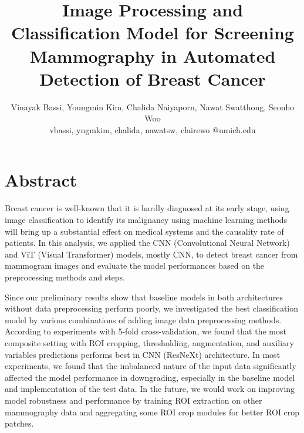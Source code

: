 \documentclass[11pt,letterpaper, twocolumn]{article}
\title{{\bf Image Processing and Classification Model for Screening Mammography in Automated Detection of Breast Cancer}}
\author{Vinayak Bassi, Youngmin Kim, Chalida Naiyaporn, Nawat Swatthong, Seonho Woo \\
vbassi, yngmkim, chalida, nawatsw, clairewo @umich.edu}
\date{}
\begin{document}
\maketitle
\section{Abstract}


Breast cancer is well-known that it is hardly diagnosed at its early stage, using image classification to identify its malignancy using machine learning methods will bring up a substantial effect on medical systems and the causality rate of patients. In this analysis, we applied the CNN (Convolutional Neural Network) and ViT (Visual Transformer) models, mostly CNN, to detect breast cancer from mammogram images and evaluate the model performances based on the preprocessing methods and steps. 

Since our preliminary results show that baseline models in both architectures without data preprocessing perform poorly, we investigated the best classification model by various combinations of adding image data preprocessing methods. According to experiments with 5-fold cross-validation, we found that the most composite setting with ROI cropping, thresholding, augmentation, and auxiliary variables predictions performs best in CNN (ResNeXt) architecture. In most experiments, we found that the imbalanced nature of the input data significantly affected the model performance in downgrading, especially in the baseline model and implementation of the test data. In the future, we would work on improving model robustness and performance by training ROI extraction on other mammography data and aggregating some ROI crop modules for better ROI crop patches.
\end{document}
